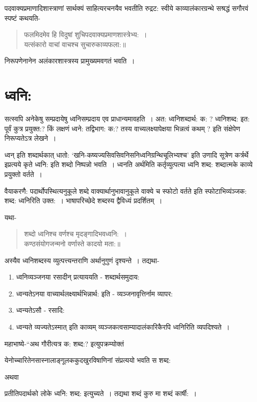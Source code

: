 {पदवाक्यप्रमाणादिशास्त्राणां सार्थक्यं साहित्यरचनयैव भवतीति रुद्रट: स्वीये काव्यालंकारग्रन्थे सश्रद्धं सगौरवं स्पष्टं कथयति-
\begin{verse}
फलमिदमेव हि विदुषां शुचिपदवाक्यप्रमाणशास्त्रेभ्य:~। \\
यत्संकारो वाचां वाचश्च सुचारुकाव्यफला:॥
\end{verse}
निरूपणेनानेन अलंकारशास्त्रस्य प्रामुख्यमवगतं भवति~। 

\section*{ध्वनि:}

सत्स्वपि अनेकेषु सम्प्रदायेषु ध्वनिसम्प्रदाय एव प्राधान्यमावहति~। अत: ध्वनिशब्दार्थ: क: ? ध्वनिशब्द: इत: पूर्वं कुत्र प्रयुक्त:? किं लक्षणं ध्वने: तद्विभाग: क:? तस्य वाच्यलक्ष्यापेक्षया भिन्नत्वं कथम् ? इति संक्षेपेण निरूप्यतेऽत्र लेखने~। 

ध्वन् इति शब्दार्थकात् धातो: ‘खनि-कष्यज्यसिवसिवनिसनिध्वनिग्रन्थिचूलिभ्यश्च’ इति उणादि सूत्रेण कर्त्रर्थे इप्रत्यये कृते ध्वनि: इति शब्दो निष्पन्नो भवति~। ध्वनति अर्थमिति कर्तृव्युत्पत्या ध्वनि शब्द: शब्दात्मके काव्ये प्रयुक्तो वर्तते~। 

वैयाकरणै: पदार्थोपस्थित्यनुकूले शब्दे वाक्यार्थानुभावानुकूले वाक्ये च स्फोटो वर्तते इति स्फोटाभिव्यंञ्जक: शब्द: ध्वनिरिति उक्त:~। भाषापरिच्छेदे शब्दस्य द्वैविध्यं प्रदर्शितम्~। 

यथा-
\begin{verse}
शब्दो ध्वनिश्च वर्णश्च मृदङ्गादिभवध्वनि:~। \\
कण्ठसंयोगजन्मनो वर्णास्ते कादयो मता:॥
\end{verse}
अस्यैव ध्वनिशब्दस्य व्युत्पत्त्यन्तराणि अर्थानुगुणं दृश्यन्ते~। तद्यथा-
\begin{enumerate}
\item ध्वनिव्यञ्जनया रसादीन् प्रत्याययति - शब्दार्थसमुदाय:
\item ध्वन्यतेऽनया वाच्यार्थलक्ष्यार्थभिन्नार्थ: इति - व्यञ्जनावृत्तिर्नाम व्यापर: 
\item ध्वन्यतेऽसौ - रसादि:
\item ध्वन्यते व्यज्यतेऽस्मात् इति काव्यम् व्यञ्जकत्वसाम्यादालंकारिकैरपि ध्वनिरिति व्यपदिश्यते~। 
\end{enumerate}
महाभाष्ये-“अथ गौरीत्यत्र क: शब्द:? इत्युपक्रम्योक्तं 

येनोच्चारितेनसास्नालाङ्गूलककुदखुरविषाणिनां संप्रत्ययो भवति स शब्द:

अथवा

प्रतीतिपदार्थको लोके ध्वनि: शब्द: इत्युच्यते~। तद्यथा शब्दं कुरु मा शब्दं कार्षी:~। 

}
